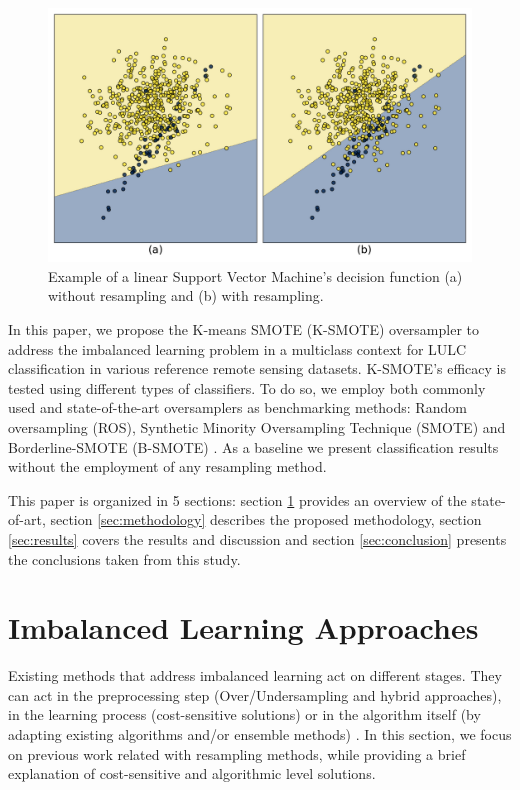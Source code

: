 \documentclass[parskip=full]{scrartcl}
\begin{document}
\begin{figure}[H]
	\centering
	\includegraphics[width=.75\linewidth]{../analysis/oversampling_decision_function}
	\caption{Example of a linear Support Vector Machine's decision function (a) without
		resampling and (b) with resampling.}
	\label{fig:oversampling_decision_function}
\end{figure}

In this paper, we propose the K-means SMOTE (K-SMOTE) \cite{Douzas2018}
oversampler to address the imbalanced learning problem in a multiclass context
for LULC classification in various reference remote sensing datasets. K-SMOTE's
efficacy is tested using different types of classifiers. To do so, we employ
both commonly used and state-of-the-art oversamplers as benchmarking methods:
Random oversampling (ROS), Synthetic Minority Oversampling Technique (SMOTE)
\cite{Chawla2002} and Borderline-SMOTE (B-SMOTE) \cite{Han2005}.
As a baseline we present classification results without the employment of any
resampling method.

This paper is organized in 5 sections: section \ref{sec:sota} provides
an overview of the state-of-art, section \ref{sec:methodology} describes the
proposed methodology, section \ref{sec:results} covers the results and
discussion and section \ref{sec:conclusion} presents the conclusions taken
from this study.

\section{Imbalanced Learning Approaches} \label{sec:sota}

Existing methods that address imbalanced learning act on different stages. They
can act in the preprocessing step (Over/Undersampling and hybrid approaches),
in the learning process (cost-sensitive solutions) or in the algorithm itself
(by adapting existing algorithms and/or ensemble methods)
\cite{Kaur2019}. In this section, we focus on previous work related
with resampling methods, while providing a brief explanation of cost-sensitive
and algorithmic level solutions.
\end{document}
